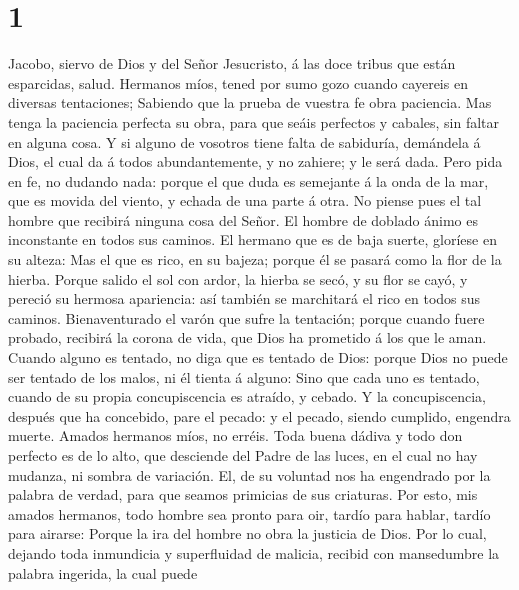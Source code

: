 \hypertarget{section}{%
\section{1}\label{section}}

 Jacobo, siervo de Dios y del Señor Jesucristo, á las doce
tribus que están esparcidas, salud.  Hermanos míos, tened
por sumo gozo cuando cayereis en diversas tentaciones; 
Sabiendo que la prueba de vuestra fe obra paciencia.  Mas
tenga la paciencia perfecta su obra, para que seáis perfectos y cabales,
sin faltar en alguna cosa.  Y si alguno de vosotros tiene
falta de sabiduría, demándela á Dios, el cual da á todos abundantemente,
y no zahiere; y le será dada.  Pero pida en fe, no dudando
nada: porque el que duda es semejante á la onda de la mar, que es movida
del viento, y echada de una parte á otra.  No piense pues
el tal hombre que recibirá ninguna cosa del Señor.  El
hombre de doblado ánimo es inconstante en todos sus caminos.
 El hermano que es de baja suerte, gloríese en su alteza:
 Mas el que es rico, en su bajeza; porque él se pasará
como la flor de la hierba.  Porque salido el sol con
ardor, la hierba se secó, y su flor se cayó, y pereció su hermosa
apariencia: así también se marchitará el rico en todos sus caminos.
 Bienaventurado el varón que sufre la tentación; porque
cuando fuere probado, recibirá la corona de vida, que Dios ha prometido
á los que le aman.  Cuando alguno es tentado, no diga que
es tentado de Dios: porque Dios no puede ser tentado de los malos, ni él
tienta á alguno:  Sino que cada uno es tentado, cuando de
su propia concupiscencia es atraído, y cebado.  Y la
concupiscencia, después que ha concebido, pare el pecado: y el pecado,
siendo cumplido, engendra muerte.  Amados hermanos míos,
no erréis.  Toda buena dádiva y todo don perfecto es de
lo alto, que desciende del Padre de las luces, en el cual no hay
mudanza, ni sombra de variación.  El, de su voluntad nos
ha engendrado por la palabra de verdad, para que seamos primicias de sus
criaturas.  Por esto, mis amados hermanos, todo hombre
sea pronto para oir, tardío para hablar, tardío para airarse:
 Porque la ira del hombre no obra la justicia de Dios.
 Por lo cual, dejando toda inmundicia y superfluidad de
malicia, recibid con mansedumbre la palabra ingerida, la cual puede
